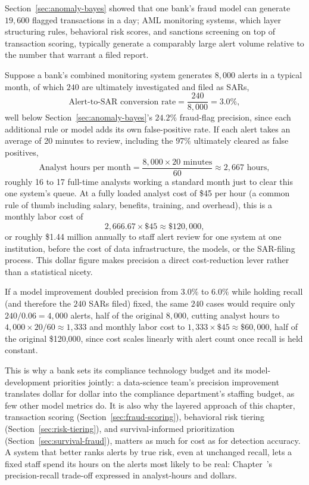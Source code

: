 \documentclass[../ai_in_finance]{subfiles}
\begin{document}
Section~\ref{sec:anomaly-bayes} showed that one bank's fraud model can generate $19{,}600$ flagged transactions in a day; AML monitoring systems, which layer structuring rules, behavioral risk scores, and sanctions screening on top of transaction scoring, typically generate a comparably large alert volume relative to the number that warrant a filed report.

Suppose a bank's combined monitoring system generates $8{,}000$ alerts in a typical month, of which $240$ are ultimately investigated and filed as SARs,
\begin{equation*}
\text{Alert-to-SAR conversion rate} = \frac{240}{8{,}000} = 3.0\%,
\end{equation*}
well below Section~\ref{sec:anomaly-bayes}'s $24.2\%$ fraud-flag precision, since each additional rule or model adds its own false-positive rate. If each alert takes an average of 20 minutes to review, including the $97\%$ ultimately cleared as false positives,
\begin{equation*}
\text{Analyst hours per month} = \frac{8{,}000 \times 20 \text{ minutes}}{60} \approx 2{,}667 \text{ hours},
\end{equation*}
roughly 16 to 17 full-time analysts working a standard month just to clear this one system's queue. At a fully loaded analyst cost of \$45 per hour (a common rule of thumb including salary, benefits, training, and overhead), this is a monthly labor cost of
\begin{equation*}
2{,}666.67 \times \$45 \approx \$120{,}000,
\end{equation*}
or roughly \$1.44 million annually to staff alert review for one system at one institution, before the cost of data infrastructure, the models, or the SAR-filing process. This dollar figure makes precision a direct cost-reduction lever rather than a statistical nicety.

If a model improvement doubled precision from $3.0\%$ to $6.0\%$ while holding recall (and therefore the $240$ SARs filed) fixed, the same $240$ cases would require only $240/0.06 = 4{,}000$ alerts, half of the original $8{,}000$, cutting analyst hours to $4{,}000 \times 20/60 \approx 1{,}333$ and monthly labor cost to $1{,}333 \times \$45 \approx \$60{,}000$, half of the original \$120,000, since cost scales linearly with alert count once recall is held constant.

This is why a bank sets its compliance technology budget and its model-development priorities jointly: a data-science team's precision improvement translates dollar for dollar into the compliance department's staffing budget, as few other model metrics do. It is also why the layered approach of this chapter, transaction scoring (Section~\ref{sec:fraud-scoring}), behavioral risk tiering (Section~\ref{sec:risk-tiering}), and survival-informed prioritization (Section~\ref{sec:survival-fraud}), matters as much for cost as for detection accuracy. A system that better ranks alerts by true risk, even at unchanged recall, lets a fixed staff spend its hours on the alerts most likely to be real: Chapter~'s precision-recall trade-off expressed in analyst-hours and dollars.
\end{document}
